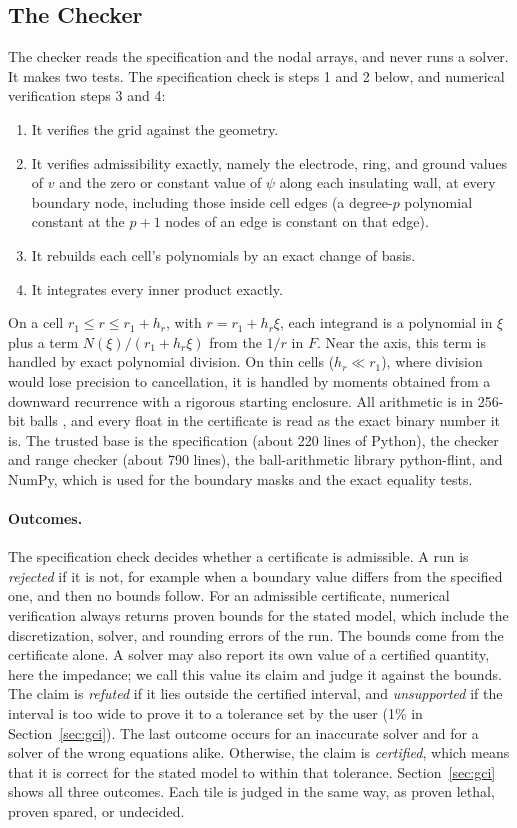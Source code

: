 \documentclass[11pt]{article}
\begin{document}
\subsection{The Checker}
The checker reads the specification and the nodal arrays, and never runs a
solver. It makes two tests. The specification check is steps 1 and 2 below,
and numerical verification steps 3 and 4:
\begin{enumerate}
\item It verifies the grid against the geometry.
\item It verifies admissibility exactly, namely the electrode, ring, and ground values of $v$ and the zero or constant value of $\psi$ along each insulating wall, at every
boundary node, including those inside cell edges (a degree-$p$ polynomial
constant at the $p+1$ nodes of an edge is constant on that edge).
\item It rebuilds each cell's polynomials by an exact change of basis.
\item It integrates every inner product exactly.
\end{enumerate}
On a cell $r_1\le r\le r_1+h_r$, with $r=r_1+h_r\xi$, each integrand is a polynomial
in $\xi$ plus a term $N(\xi)/(r_1+h_r\xi)$ from the $1/r$ in $F$. Near the axis, this
term is handled by exact polynomial division. On thin cells ($h_r\ll r_1$), where division would lose precision to cancellation, it is handled
by moments obtained from a downward recurrence with a rigorous starting
enclosure. All arithmetic is in 256-bit balls \cite{arb}, and every float in the
certificate is read as the exact binary number it is. The trusted base is the
specification (about 220 lines of Python), the checker and range checker (about
790 lines), the ball-arithmetic library python-flint, and NumPy, which is used
for the boundary masks and the exact equality tests.

\paragraph{Outcomes.} The specification check decides whether a certificate is
admissible. A run is \emph{rejected} if it is not, for example when a boundary
value differs from the specified one, and then no bounds follow. For an admissible
certificate, numerical verification always returns proven bounds for the stated
model, which include the discretization, solver, and rounding errors of the run.
The bounds come from the certificate alone. A solver may also report its own
value of a certified quantity, here the impedance; we call this value its claim
and judge it against the bounds. The claim is
\emph{refuted} if it lies outside the certified interval, and \emph{unsupported}
if the interval is too wide to prove it to a tolerance set by the user (1\% in
Section~\ref{sec:gci}). The last outcome
occurs for an inaccurate solver and for a solver of the wrong equations alike.
Otherwise, the claim is \emph{certified}, which means that it is correct for the
stated model to within that tolerance. Section~\ref{sec:gci} shows all three outcomes. Each tile is judged in
the same way, as proven lethal, proven spared, or undecided.
\end{document}
